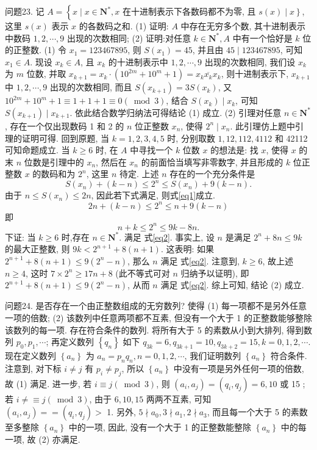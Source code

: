 问题23. 记 $A=\left\{x \mid x \in \mathbf{N}^*, x\right.$ 在十进制表示下各数码都不为零, 且 $\left.s(x) \mid x\right\}$, 这里 $s(x)$ 表示 $x$ 的各数码之和.
(1) 证明: $A$ 中存在无穷多个数, 其十进制表示中数码 $1,2, \cdots, 9$ 出现的次数相同;
(2) 证明:对任意 $k \in \mathbf{N}^*, A$ 中有一个恰好是 $k$ 位的正整数.
(1) 令 $x_1=123467895$, 则 $S\left(x_1\right)=45$, 并且由 $45 \mid 123467895$, 可知 $x_1 \in A$. 现设 $x_k \in A$, 且 $x_k$ 的十进制表示中 $1,2, \cdots, 9$ 出现的次数相同, 我们设 $x_k$ 为 $m$ 位数, 并取 $x_{k+1}=x_k \cdot\left(10^{2 m}+10^m+1\right)=\overline{x_k x_k x_k}$, 则十进制表示下, $x_{k+1}$ 中 $1,2, \cdots, 9$ 出现的次数相同, 而且 $S\left(x_{k+1}\right)=3 S\left(x_k\right)$, 又 $10^{2 m}+ 10^m+1 \equiv 1+1+1 \equiv 0(\bmod 3)$, 结合 $S\left(x_k\right) \mid x_k$, 可知 $S\left(x_{k+1}\right) \mid x_{k+1}$. 依此结合数学归纳法可得结论 (1) 成立.
(2) 引理对任意 $n \in \mathbf{N}^*$, 存在一个仅出现数码 1 和 2 的 $n$ 位正整数 $x_n$, 使得 $2^n \mid x_n$.
此引理仿上题中引理的证明可得.
回到原题, 当 $k=1,2,3,4,5$ 时, 分别取数 $1,12,112,4112$ 和 42112 可知命题成立.
当 $k \geqslant 6$ 时, 在 $A$ 中寻找一个 $k$ 位数 $x$ 的想法是: 找 $x$, 使得 $x$ 的末 $n$ 位数是引理中的 $x_n$, 然后在 $x_n$ 的前面恰当填写非零数字, 并且形成的 $k$ 位正整数 $x$ 的数码和为 $2^n$, 这里 $n$ 待定.
上述 $n$ 存在的一个充分条件是
$$
S\left(x_n\right)+(k-n) \leqslant 2^n \leqslant S\left(x_n\right)+9(k-n) . \label{eq1}
$$
由于 $n \leqslant S\left(x_n\right) \leqslant 2 n$, 因此若下式满足, 则式\ref{eq1}成立.
$$
2 n+(k-n) \leqslant 2^n \leqslant n+9(k-n)
$$
即
$$
n+k \leqslant 2^n \leqslant 9 k-8 n . \label{eq2}
$$
下证: 当 $k \geqslant 6$ 时,存在 $n \in \mathbf{N}^*$. 满足 式\ref{eq2}.
事实上, 设 $n$ 是满足 $2^n+8 n \leqslant 9 k$ 的最大正整数, 则 $9 k<2^{n+1}+8(n+1)$. 这表明: 如果 $2^{n+1}+8(n+1) \leqslant 9\left(2^n-n\right)$, 那么 $n$ 满足 式\ref{eq2}.
注意到, $k \geqslant 6$, 故上述 $n \geqslant 4$, 这时 $7 \times 2^n \geqslant 17 n+8$ (此不等式可对 $n$ 归纳予以证明), 即 $2^{n+1}+8(n+1) \leqslant 9\left(2^n-n\right)$, 从而 $n$ 满足 式\ref{eq2}.
综上可知, 结论 (2) 成立.



问题24. 是否存在一个由正整数组成的无穷数列? 使得
(1) 每一项都不是另外任意一项的倍数;
(2) 该数列中任意两项都不互素, 但没有一个大于 1 的正整数能够整除该数列的每一项.
存在符合条件的数列.
将所有大于 5 的素数从小到大排列, 得到数列 $p_0, p_1, \cdots$; 再定义数列 $\left\{q_n\right\}$ 如下 $q_{3 k}=6, q_{3 k+1}=10, q_{3 k+2}=15, k=0,1,2, \cdots$. 现在定义数列 $\left\{a_n\right\}$ 为 $a_n=p_n q_n, n=0,1,2, \cdots$, 我们证明数列 $\left\{a_n\right\}$ 符合条件.
注意到, 对下标 $i \neq j$ 有 $p_i \neq p_j$, 所以 $\left\{a_n\right\}$ 中没有一项是另外任何一项的倍数, 故 (1) 满足.
进一步, 若 $i \equiv j(\bmod 3)$, 则 $\left(a_i, a_j\right)=\left(q_i, q_j\right)=6,10$ 或 15 ; 若 $i \neq \equiv j(\bmod 3)$, 由于 $6,10,15$ 两两不互素, 可知 $\left(a_i, a_j\right)==\left(q_i, q_j\right)>$ 1. 另外, $5 \nmid a_0, 3 \nmid a_1, 2 \nmid a_3$, 而且每一个大于 5 的素数至多整除 $\left\{a_n\right\}$ 中的一项, 因此, 没有一个大于 1 的正整数能整除 $\left\{a_n\right\}$ 中的每一项, 故 (2) 亦满足.



